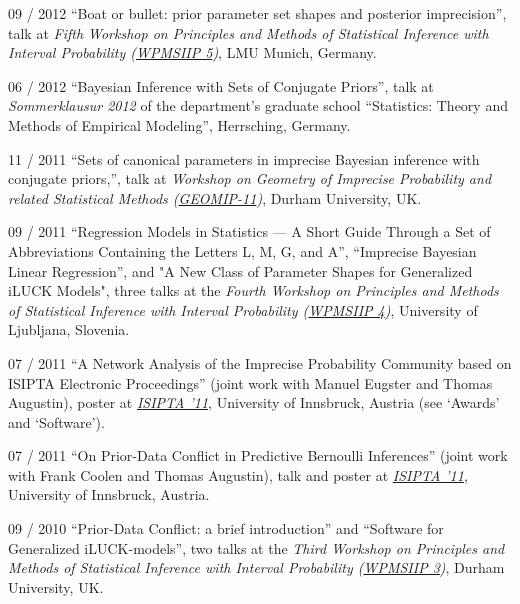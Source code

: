\documentclass[a4paper]{simplecv}
\begin{document}
\begin{topic}
\item[09 / 2012] ``Boat or bullet: prior parameter set shapes and posterior imprecision'', talk at
                 \emph{Fifth Workshop on Principles and Methods of Statistical Inference with Interval Probability (\href{http://statsoz-neu.userweb.mwn.de/research/WPMSIIP_2012/}{WPMSIIP 5})},
                 LMU Munich, Germany.

\item[06 / 2012] ``Bayesian Inference with Sets of Conjugate Priors'', talk at \emph{Sommerklausur 2012} of the department's graduate school
                 ``Statistics: Theory and Methods of Empirical Modeling'', Herrsching, Germany.

\item[11 / 2011] ``Sets of canonical parameters in imprecise Bayesian inference with conjugate priors,'', talk at
                 \emph{Workshop on Geometry of Imprecise Probability and related Statistical Methods (\href{http://maths.dur.ac.uk/stats/people/fc/geomip11.html}{GEOMIP-11})}, Durham University, UK.

\item[09 / 2011] ``Regression Models in Statistics --- A Short Guide Through a Set of Abbreviations Containing the Letters L, M, G, and A'',
                 ``Imprecise Bayesian Linear Regression'', and "A New Class of Parameter Shapes for Generalized iLUCK Models",
                 three talks at the
                 \emph{Fourth Workshop on Principles and Methods of Statistical Inference with Interval Probability (\href{http://wpmsiip2011.fdvinfo.net/c/646/Information/}{WPMSIIP 4})},
                 University of Ljubljana, Slovenia.

\item[07 / 2011] ``A Network Analysis of the Imprecise Probability Community based on ISIPTA Electronic Proceedings''
                 (joint work with Manuel Eugster and Thomas Augustin),
                 poster at \emph{\href{http://www.sipta.org/isipta11/}{ISIPTA '11}}, University of Innsbruck, Austria (see `Awards' and `Software').

\item[07 / 2011] ``On Prior-Data Conflict in Predictive Bernoulli Inferences'' (joint work with Frank Coolen and Thomas Augustin),
                 talk and poster at \emph{\href{http://www.sipta.org/isipta11/}{ISIPTA '11}}, University of Innsbruck, Austria.

\item[09 / 2010] ``Prior-Data Conflict: a brief introduction'' and ``Software for Generalized iLUCK-models'', two talks at the
                 \emph{Third Workshop on Principles and Methods of Statistical Inference with Interval Probability (\href{http://www.maths.dur.ac.uk/users/matthias.troffaes/wpmsiip2010/}{WPMSIIP 3})},
                 Durham University, UK.


\end{topic}
\end{document}
